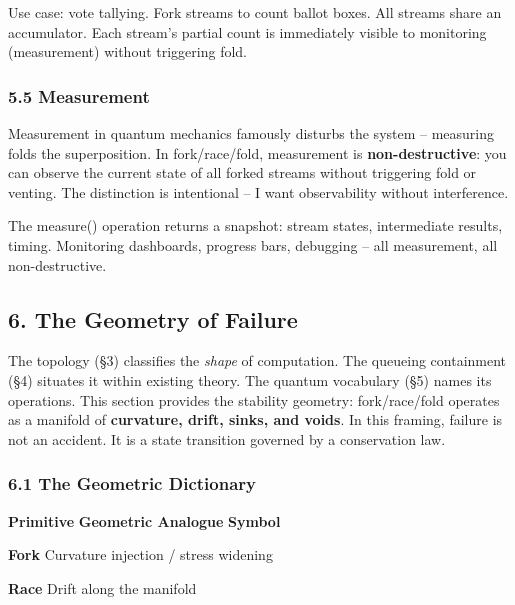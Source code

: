 \documentclass[
]{article}
\begin{document}
Use case: vote tallying. Fork streams to count ballot boxes. All streams
share an accumulator. Each stream's partial count is immediately visible
to monitoring (measurement) without triggering fold.

\subsubsection{\texorpdfstring{\textbf{5.5
Measurement}}{5.5 Measurement}}\label{measurement}

Measurement in quantum mechanics famously disturbs the system --
measuring folds the superposition. In fork/race/fold, measurement is
\textbf{non-destructive}: you can observe the current state of all
forked streams without triggering fold or venting. The distinction is
intentional -- I want observability without interference.

The measure() operation returns a snapshot: stream states, intermediate
results, timing. Monitoring dashboards, progress bars, debugging -- all
measurement, all non-destructive.

\subsection{\texorpdfstring{\textbf{6. The Geometry of
Failure}}{6. The Geometry of Failure}}\label{the-geometry-of-failure-1}

The topology (§3) classifies the \emph{shape} of computation. The
queueing containment (§4) situates it within existing theory. The
quantum vocabulary (§5) names its operations. This section provides the
stability geometry: fork/race/fold operates as a manifold of
\textbf{curvature, drift, sinks, and voids}. In this framing, failure is
not an accident. It is a state transition governed by a conservation
law.

\subsubsection{\texorpdfstring{\textbf{6.1 The Geometric
Dictionary}}{6.1 The Geometric Dictionary}}\label{the-geometric-dictionary}

\textbf{Primitive} \textbar{} \textbf{Geometric Analogue} \textbar{}
\textbf{Symbol} \textbar{}

\textbf{Fork} \textbar{} Curvature injection / stress widening
\textbar{} \textbar{}

\textbf{Race} \textbar{} Drift along the manifold \textbar{} \textbar{}
\end{document}
